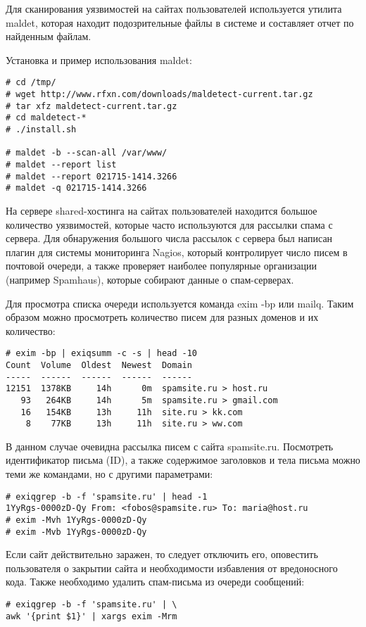 Для сканирования уязвимостей на сайтах пользователей используется утилита maldet, которая находит подозрительные файлы в системе и составляет отчет по найденным файлам.

Установка и пример использования maldet:
\begin{lstlisting}
# cd /tmp/
# wget http://www.rfxn.com/downloads/maldetect-current.tar.gz
# tar xfz maldetect-current.tar.gz
# cd maldetect-*
# ./install.sh

# maldet -b --scan-all /var/www/
# maldet --report list
# maldet --report 021715-1414.3266
# maldet -q 021715-1414.3266
\end{lstlisting}

На сервере shared-хостинга на сайтах пользователей находится большое количество уязвимостей, которые часто используются для рассылки спама с сервера.
Для обнаружения большого числа рассылок с сервера был написан плагин для системы мониторинга Nagios, который контролирует число писем в почтовой очереди, а также проверяет наиболее популярные организации (например Spamhaus), которые собирают данные о спам-серверах.

Для просмотра списка очереди используется команда exim -bp или mailq.
Таким образом можно просмотреть количество писем для разных доменов и их количество:
\begin{lstlisting}
# exim -bp | exiqsumm -c -s | head -10
Count  Volume  Oldest  Newest  Domain
-----  ------  ------  ------  ------
12151  1378KB     14h      0m  spamsite.ru > host.ru
   93   264KB     14h      5m  spamsite.ru > gmail.com
   16   154KB     13h     11h  site.ru > kk.com
    8    77KB     13h     11h  site.ru > ww.com
\end{lstlisting}

В данном случае очевидна рассылка писем с сайта spamsite.ru.
Посмотреть идентификатор письма (ID), а также содержимое заголовков и тела письма можно теми же командами, но с другими параметрами:
\begin{lstlisting}
# exiqgrep -b -f 'spamsite.ru' | head -1
1YyRgs-0000zD-Qy From: <fobos@spamsite.ru> To: maria@host.ru
# exim -Mvh 1YyRgs-0000zD-Qy
# exim -Mvb 1YyRgs-0000zD-Qy
\end{lstlisting}

Если сайт действительно заражен, то следует отключить его, оповестить пользователя о закрытии сайта и необходимости избавления от вредоносного кода.
Также необходимо удалить спам-письма из очереди сообщений:
\begin{lstlisting}
# exiqgrep -b -f 'spamsite.ru' | \
awk '{print $1}' | xargs exim -Mrm
\end{lstlisting}

